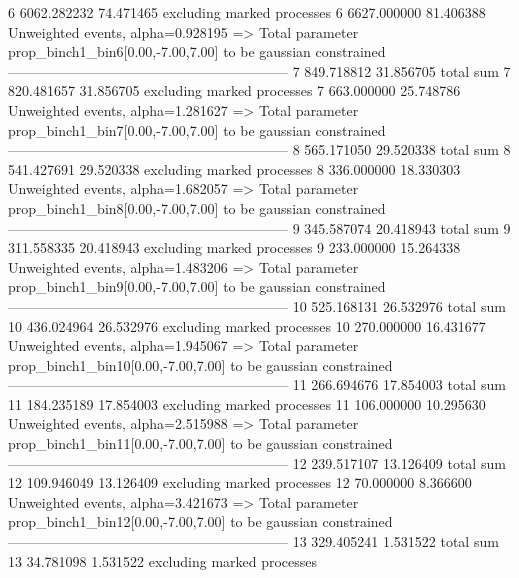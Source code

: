 6          6062.282232     74.471465       excluding marked processes    
6          6627.000000     81.406388       Unweighted events, alpha=0.928195
  => Total parameter prop_binch1_bin6[0.00,-7.00,7.00] to be gaussian constrained
------------------------------------------------------------
7          849.718812      31.856705       total sum                     
7          820.481657      31.856705       excluding marked processes    
7          663.000000      25.748786       Unweighted events, alpha=1.281627
  => Total parameter prop_binch1_bin7[0.00,-7.00,7.00] to be gaussian constrained
------------------------------------------------------------
8          565.171050      29.520338       total sum                     
8          541.427691      29.520338       excluding marked processes    
8          336.000000      18.330303       Unweighted events, alpha=1.682057
  => Total parameter prop_binch1_bin8[0.00,-7.00,7.00] to be gaussian constrained
------------------------------------------------------------
9          345.587074      20.418943       total sum                     
9          311.558335      20.418943       excluding marked processes    
9          233.000000      15.264338       Unweighted events, alpha=1.483206
  => Total parameter prop_binch1_bin9[0.00,-7.00,7.00] to be gaussian constrained
------------------------------------------------------------
10         525.168131      26.532976       total sum                     
10         436.024964      26.532976       excluding marked processes    
10         270.000000      16.431677       Unweighted events, alpha=1.945067
  => Total parameter prop_binch1_bin10[0.00,-7.00,7.00] to be gaussian constrained
------------------------------------------------------------
11         266.694676      17.854003       total sum                     
11         184.235189      17.854003       excluding marked processes    
11         106.000000      10.295630       Unweighted events, alpha=2.515988
  => Total parameter prop_binch1_bin11[0.00,-7.00,7.00] to be gaussian constrained
------------------------------------------------------------
12         239.517107      13.126409       total sum                     
12         109.946049      13.126409       excluding marked processes    
12         70.000000       8.366600        Unweighted events, alpha=3.421673
  => Total parameter prop_binch1_bin12[0.00,-7.00,7.00] to be gaussian constrained
------------------------------------------------------------
13         329.405241      1.531522        total sum                     
13         34.781098       1.531522        excluding marked processes    

